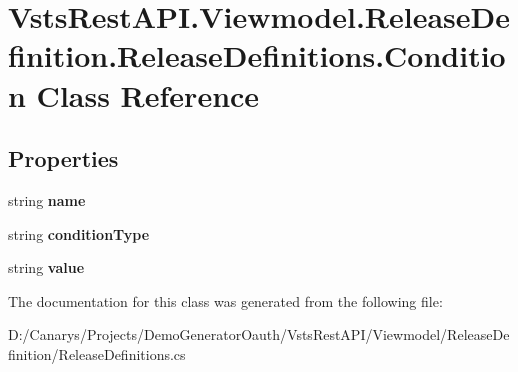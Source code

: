\hypertarget{class_vsts_rest_a_p_i_1_1_viewmodel_1_1_release_definition_1_1_release_definitions_1_1_condition}{}\section{Vsts\+Rest\+A\+P\+I.\+Viewmodel.\+Release\+Definition.\+Release\+Definitions.\+Condition Class Reference}
\label{class_vsts_rest_a_p_i_1_1_viewmodel_1_1_release_definition_1_1_release_definitions_1_1_condition}
\subsection*{Properties}
\begin{DoxyCompactItemize}
\item 
\mbox{\label{class_vsts_rest_a_p_i_1_1_viewmodel_1_1_release_definition_1_1_release_definitions_1_1_condition_a2dc0f2c5d95b9dbe29885220c5739399}} 
string {\bfseries name}
\item 
\mbox{\label{class_vsts_rest_a_p_i_1_1_viewmodel_1_1_release_definition_1_1_release_definitions_1_1_condition_ac0c7e1e76bf837d0e50458944f6ac589}} 
string {\bfseries condition\+Type}
\item 
\mbox{\label{class_vsts_rest_a_p_i_1_1_viewmodel_1_1_release_definition_1_1_release_definitions_1_1_condition_a7aa80352f078a7f5a9f420e8fbaa2917}} 
string {\bfseries value}
\end{DoxyCompactItemize}


The documentation for this class was generated from the following file\+:\begin{DoxyCompactItemize}
\item 
D\+:/\+Canarys/\+Projects/\+Demo\+Generator\+Oauth/\+Vsts\+Rest\+A\+P\+I/\+Viewmodel/\+Release\+Definition/Release\+Definitions.\+cs\end{DoxyCompactItemize}
